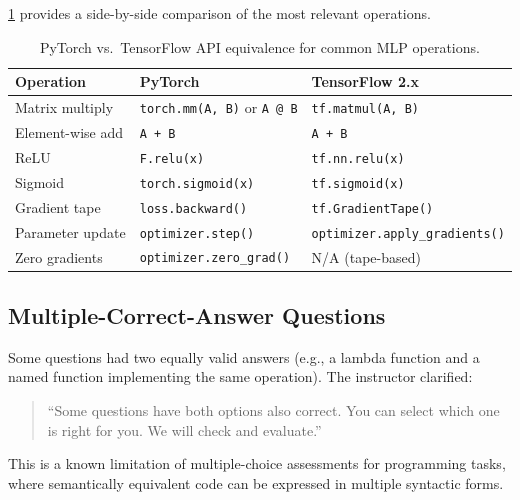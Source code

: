 \documentclass[12pt,a4paper]{article}
\begin{document}
\cref{tab:tf_pt_compare} provides a side-by-side comparison of the
most relevant operations.

\begin{table}[htbp]
  \centering
  \caption{PyTorch vs.\ TensorFlow API equivalence for common MLP operations.}
  \label{tab:tf_pt_compare}
  \begin{tabularx}{\linewidth}{lXX}
    \toprule
    \textbf{Operation} & \textbf{PyTorch} & \textbf{TensorFlow 2.x} \\
    \midrule
    Matrix multiply    & \texttt{torch.mm(A, B)} or \texttt{A @ B}
                       & \texttt{tf.matmul(A, B)} \\
    Element-wise add   & \texttt{A + B}             & \texttt{A + B} \\
    ReLU               & \texttt{F.relu(x)}         & \texttt{tf.nn.relu(x)} \\
    Sigmoid            & \texttt{torch.sigmoid(x)}  & \texttt{tf.sigmoid(x)} \\
    Gradient tape      & \texttt{loss.backward()}   & \texttt{tf.GradientTape()} \\
    Parameter update   & \texttt{optimizer.step()}  & \texttt{optimizer.apply\_gradients()} \\
    Zero gradients     & \texttt{optimizer.zero\_grad()} & N/A (tape-based) \\
    \bottomrule
  \end{tabularx}
\end{table}

\subsection{Multiple-Correct-Answer Questions}
\label{ssec:multi_correct}

Some questions had two equally valid answers (e.g., a lambda function
and a named function implementing the same operation).  The
instructor clarified:

\begin{quote}
  ``Some questions have both options also correct.  You can select which
  one is right for you.  We will check and evaluate.''
\end{quote}

\noindent
This is a known limitation of multiple-choice assessments for
programming tasks, where semantically equivalent code can be expressed
in multiple syntactic forms.
\end{document}
